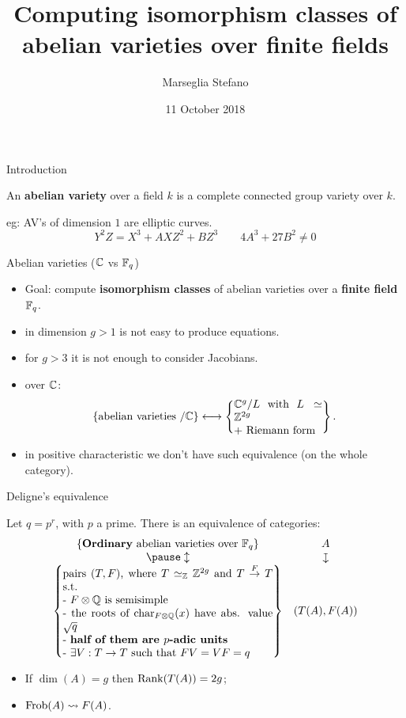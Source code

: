 \documentclass[handout]{beamer}
\title[]{Computing isomorphism classes of abelian varieties over finite fields}
\author[Marseglia Stefano]{Marseglia Stefano}
\institute[]{MPI/Stockholms University}
\date{11 October  2018}
\begin{document}
\begin{frame}
\titlepage
\end{frame}

\begin{frame}{ Introduction }
\begin{df}
 An \textbf{abelian variety} over a field $k$ is a complete connected group variety over $k$.
\end{df}
 \pause eg: 
 AV's of dimension $1$ are elliptic curves.
 \[ Y^2Z=X^3+AXZ^2+BZ^3 \qquad 4A^3+27B^2\neq0 \]
\end{frame}

\begin{frame}{ Abelian varieties ($\mathbb{C}$ vs $ \mathbb{F}_q $) }
\begin{itemize}
 \item Goal: compute \textbf{isomorphism classes} of abelian varieties over a \textbf{finite field} $\mathbb{F}_q$.
 \pause \item in dimension $g>1$ is not easy to produce equations.
 \pause \item for $g>3$ it is not enough to consider Jacobians.
 \pause \item over $\mathbb{C}$:
 \[
      \set{ \text{abelian varieties $/\C$} } \longleftrightarrow 
      \set{\parbox[c]{8em}{$\C^g/L$ with $L\simeq \Z^{2g}$\\ $+$ Riemann form}}.
 \]
 \pause \vspace{-6mm} \item in positive characteristic we don't have such equivalence (on the whole category).
\end{itemize}
\end{frame}

\begin{frame}{ Deligne's equivalence }
\begin{theorem}[Deligne '69]
Let $q=p^r$, with $p$ a prime. There is an equivalence of categories:
\[\begin{array}{cc}
\set{\text{\textbf{Ordinary} abelian varieties over $\F_q$}}	& A \\
\pause \updownarrow							& \downmapsto \\
\set{\parbox[p]{19em}{pairs $(T,F)$, where $T\simeq_\Z \Z^{2g}$ and $T\overset{F}{\to} T$ s.t.\\
- $F\otimes \Q$ is semisimple\\
- the roots of $\Char_{F\otimes\Q}(x)$ have abs. value $\sqrt{q}$\\
- \textbf{half of them are $p$-adic units}\\
- $\exists V:T\to T$ such that $FV=VF=q$
}}	& (T(A),F(A))
\end{array}\]
\end{theorem}
\pause
\begin{remark}
\begin{itemize}
 \item If $\dim(A)=g$ then $\operatorname{Rank}(T(A))=2g$;
 \item $\operatorname{Frob}(A)\rightsquigarrow F(A)$.
\end{itemize}
\end{remark}
\end{frame}
\end{document}
